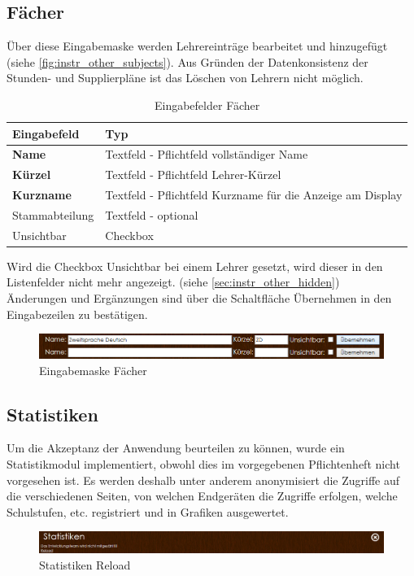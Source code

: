 \subsection{Fächer}
Über diese Eingabemaske werden Lehrereinträge bearbeitet und hinzugefügt (siehe \autoref{fig:instr_other_subjects}). Aus Gründen der Datenkonsistenz der Stunden- und Supplierpläne ist das Löschen von Lehrern nicht möglich.
\begin{table}[H]
\centering
\begin{tabular}{p{3 cm}p{10 cm}}
   \toprule
   \textbf{Eingabefeld} & \textbf{Typ} \\
   \midrule
          \textbf{Name} & Textfeld - Pflichtfeld \newline vollständiger Name \\
          \hline
          \textbf{Kürzel} & Textfeld - Pflichtfeld \newline Lehrer-Kürzel \\
          \hline
          \textbf{Kurzname} & Textfeld - Pflichtfeld \newline Kurzname für die Anzeige am Display \\
          \hline
          Stammabteilung & Textfeld - optional \\
          \hline
          Unsichtbar & Checkbox \\
   \bottomrule
\end{tabular}
\caption{Eingabefelder Fächer}
\end{table}
Wird die Checkbox Unsichtbar bei einem Lehrer gesetzt, wird dieser in den Listenfelder nicht mehr angezeigt. (siehe \autoref{sec:instr_other_hidden})\\
Änderungen und Ergänzungen sind über die Schaltfläche Übernehmen in den Eingabezeilen zu bestätigen.
\begin{figure}[H]
\centering
\includegraphics[keepaspectratio=true, width=17cm]{images/screenshots/subjects_input.png}
\caption{Eingabemaske Fächer}
\label{fig:instr_other_subjects}
\end{figure}
\subsection{Statistiken}
Um die Akzeptanz der Anwendung beurteilen zu können, wurde ein Statistikmodul implementiert, obwohl dies im vorgegebenen Pflichtenheft nicht vorgesehen ist. Es werden deshalb unter anderem anonymisiert die Zugriffe auf die verschiedenen Seiten, von welchen Endgeräten die Zugriffe erfolgen, welche Schulstufen, etc. registriert und in Grafiken ausgewertet.
\begin{figure}[H]
\centering
\includegraphics[keepaspectratio=true, width=17cm]{images/screenshots/statistics_header.png}
\caption{Statistiken Reload}
\label{fig:instr_other_statistics_header}
\end{figure}
